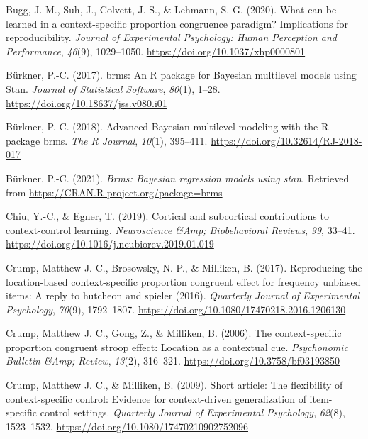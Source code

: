 \documentclass[
  ,man,floatsintext]{apa6}
\newlength{\cslhangindent}
\newlength{\cslentryspacingunit} %
\newenvironment{CSLReferences}[2] %
 {%
  \setlength{\parindent}{0pt}
  \ifodd #1
  \let\oldpar\par
  \def\par{\hangindent=\cslhangindent\oldpar}
  \fi
  \setlength{\parskip}{#2\cslentryspacingunit}
 }%
 {}
\begin{document}
\begin{CSLReferences}{1}{0}
\leavevmode{}%
Bugg, J. M., Suh, J., Colvett, J. S., \& Lehmann, S. G. (2020). What can be learned in a context-specific proportion congruence paradigm? Implications for reproducibility. \emph{Journal of Experimental Psychology: Human Perception and Performance}, \emph{46}(9), 1029--1050. \url{https://doi.org/10.1037/xhp0000801}

\leavevmode{}%
Bürkner, P.-C. (2017). {brms}: An {R} package for {Bayesian} multilevel models using {Stan}. \emph{Journal of Statistical Software}, \emph{80}(1), 1--28. \url{https://doi.org/10.18637/jss.v080.i01}

\leavevmode{}%
Bürkner, P.-C. (2018). Advanced {Bayesian} multilevel modeling with the {R} package {brms}. \emph{The R Journal}, \emph{10}(1), 395--411. \url{https://doi.org/10.32614/RJ-2018-017}

\leavevmode{}%
Bürkner, P.-C. (2021). \emph{Brms: Bayesian regression models using stan}. Retrieved from \url{https://CRAN.R-project.org/package=brms}

\leavevmode{}%
Chiu, Y.-C., \& Egner, T. (2019). Cortical and subcortical contributions to context-control learning. \emph{Neuroscience \&Amp; Biobehavioral Reviews}, \emph{99}, 33--41. \url{https://doi.org/10.1016/j.neubiorev.2019.01.019}

\leavevmode{}%
Crump, Matthew J. C., Brosowsky, N. P., \& Milliken, B. (2017). Reproducing the location-based context-specific proportion congruent effect for frequency unbiased items: A reply to hutcheon and spieler (2016). \emph{Quarterly Journal of Experimental Psychology}, \emph{70}(9), 1792--1807. \url{https://doi.org/10.1080/17470218.2016.1206130}

\leavevmode{}%
Crump, Matthew J. C., Gong, Z., \& Milliken, B. (2006). The context-specific proportion congruent stroop effect: Location as a contextual cue. \emph{Psychonomic Bulletin \&Amp; Review}, \emph{13}(2), 316--321. \url{https://doi.org/10.3758/bf03193850}

\leavevmode{}%
Crump, Matthew J. C., \& Milliken, B. (2009). Short article: The flexibility of context-specific control: Evidence for context-driven generalization of item-specific control settings. \emph{Quarterly Journal of Experimental Psychology}, \emph{62}(8), 1523--1532. \url{https://doi.org/10.1080/17470210902752096}


\end{CSLReferences}
\end{document}
